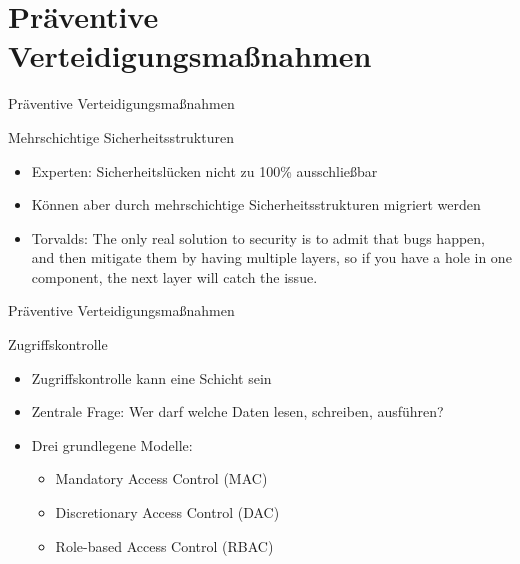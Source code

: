 \newcommand{\gqq}[1]{\glqq#1\grqq}

\section{Präventive Verteidigungsmaßnahmen}

\begin{frame}{Präventive Verteidigungsmaßnahmen}
        \begin{block}{Mehrschichtige Sicherheitsstrukturen}
                \begin{itemize}
                        \item Experten: Sicherheitslücken nicht zu 100\% ausschließbar
                        \pause
                        \item Können aber durch mehrschichtige Sicherheitsstrukturen migriert werden
                        \pause
                        \item Torvalds: \gqq{The only real solution to security is to admit that bugs happen, and then mitigate them by having multiple layers, so if you have a hole in one component, the next layer will catch the issue.} 
                \end{itemize}
        \end{block}
\end{frame}

\begin{frame}{Präventive Verteidigungsmaßnahmen}
        \begin{block}{Zugriffskontrolle}
                \begin{itemize}
                        \item Zugriffskontrolle kann eine Schicht sein
                        \pause
                        \item Zentrale Frage: Wer darf welche Daten lesen, schreiben, ausführen?
                        \pause
                        \item Drei grundlegene Modelle:
                        \pause
                        \begin{itemize}
                                \item Mandatory Access Control (MAC)
                                \pause
                                \item Discretionary Access Control (DAC)
                                \pause
                                \item Role-based Access Control (RBAC)
                        \end{itemize}
                \end{itemize}
        \end{block}
\end{frame}


